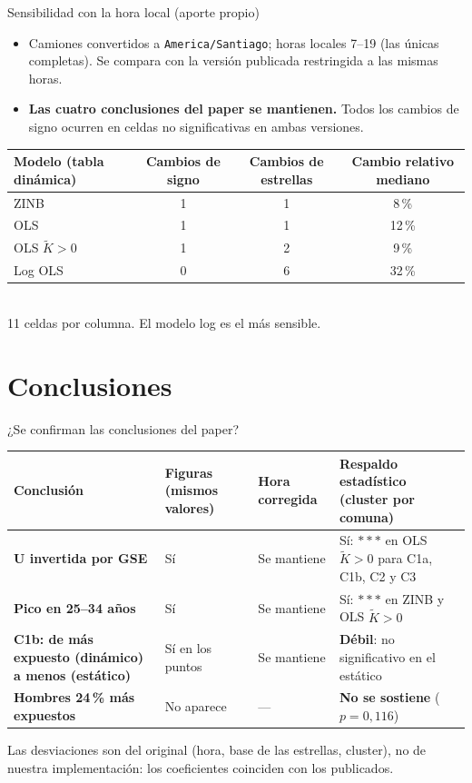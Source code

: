 \documentclass[aspectratio=169,10pt,t]{beamer}
\begin{document}
\begin{frame}{Sensibilidad con la hora local (aporte propio)}
  \begin{itemize}
    \item Camiones convertidos a \texttt{America/Santiago}; horas locales 7--19 (las únicas completas). Se compara con la versión publicada restringida a las mismas horas.
    \item \textbf{Las cuatro conclusiones del paper se mantienen.} Todos los cambios de signo ocurren en celdas no significativas en ambas versiones.
  \end{itemize}
  \centering\scriptsize
  \begin{tabular}{lccc}\toprule
    Modelo (tabla dinámica) & Cambios de signo & Cambios de estrellas & Cambio relativo mediano \\\midrule
    ZINB & 1 & 1 & 8\,\% \\
    OLS & 1 & 1 & 12\,\% \\
    OLS $\tilde K>0$ & 1 & 2 & 9\,\% \\
    Log OLS & 0 & 6 & 32\,\% \\\bottomrule
  \end{tabular}\\[2pt]
  \footnotesize 11 celdas por columna. El modelo log es el más sensible.
\end{frame}

\section{Conclusiones}

\begin{frame}{¿Se confirman las conclusiones del paper?}
  \centering\scriptsize
  \begin{tabular}{p{3.7cm}p{2.3cm}p{2.0cm}p{4.3cm}}\toprule
    Conclusión & Figuras (mismos valores) & Hora corregida & Respaldo estadístico (cluster por comuna) \\\midrule
    \textbf{U invertida por GSE} & Sí & Se mantiene & Sí: $***$ en OLS $\tilde K>0$ para C1a, C1b, C2 y C3 \\
    \textbf{Pico en 25--34 años} & Sí & Se mantiene & Sí: $***$ en ZINB y OLS $\tilde K>0$ \\
    \textbf{C1b: de más expuesto (dinámico) a menos (estático)} & Sí en los puntos & Se mantiene & \textbf{Débil}: no significativo en el estático \\
    \textbf{Hombres 24\,\% más expuestos} & No aparece & --- & \textbf{No se sostiene} ($p=0{,}116$) \\\bottomrule
  \end{tabular}
  \vspace{4pt}

  \footnotesize Las desviaciones son del original (hora, base de las estrellas, cluster), no de nuestra implementación: los coeficientes coinciden con los publicados.
\end{frame}
\end{document}
